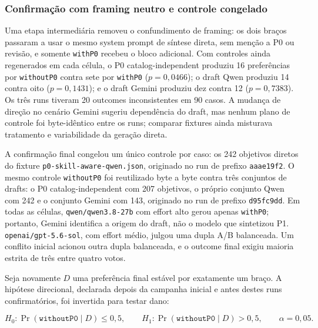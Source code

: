 \documentclass[12pt,a4paper]{article}
\begin{document}
\subsubsection*{Confirmação com framing neutro e controle congelado}

Uma etapa intermediária removeu o confundimento de framing: os dois braços passaram a usar o mesmo system prompt de síntese direta, sem menção a P0 ou revisão, e somente \texttt{withP0} recebeu o bloco adicional. Com controles ainda regenerados em cada célula, o P0 catalog-independent produziu 16 preferências por \texttt{withoutP0} contra sete por \texttt{withP0} (\(p=0{,}0466\)); o draft Qwen produziu 14 contra oito (\(p=0{,}1431\)); e o draft Gemini produziu dez contra 12 (\(p=0{,}7383\)). Os três runs tiveram 20 outcomes inconsistentes em 90 casos. A mudança de direção no cenário Gemini sugeriu dependência do draft, mas nenhum plano de controle foi byte-idêntico entre os runs; comparar fixtures ainda misturava tratamento e variabilidade da geração direta.

A confirmação final congelou um único controle por caso: os 242 objetivos diretos do fixture \nolinkurl{p0-skill-aware-qwen.json}, originado no run de prefixo \texttt{aaae19f2}. O mesmo controle \texttt{withoutP0} foi reutilizado byte a byte contra três conjuntos de drafts: o P0 catalog-independent com 207 objetivos, o próprio conjunto Qwen com 242 e o conjunto Gemini com 143, originado no run de prefixo \texttt{d95fc9dd}. Em todas as células, \nolinkurl{qwen/qwen3.8-27b} com effort alto gerou apenas \texttt{withP0}; portanto, Gemini identifica a origem do draft, não o modelo que sintetizou P1. \nolinkurl{openai/gpt-5.6-sol}, com effort médio, julgou uma dupla A/B balanceada. Um conflito inicial acionou outra dupla balanceada, e o outcome final exigiu maioria estrita de três entre quatro votos.

Seja novamente \(D\) uma preferência final estável por exatamente um braço. A hipótese direcional, declarada depois da campanha inicial e antes destes runs confirmatórios, foi invertida para testar dano:

\begin{equation}
H_0: \Pr(\texttt{withoutP0}\mid D) \leq 0{,}5,
\qquad
H_1: \Pr(\texttt{withoutP0}\mid D) > 0{,}5,
\qquad \alpha = 0{,}05.
\end{equation}
\end{document}
